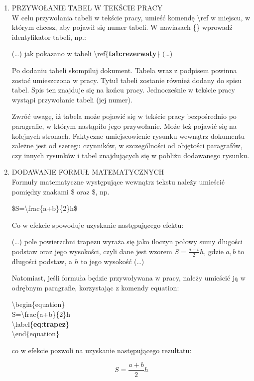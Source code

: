 \begin{enumerate}
	\item PRZYWOŁANIE TABEL W TEKŚCIE PRACY\\
	W celu przywołania tabeli w tekście pracy, umieść komendę \textbackslash ref w miejscu, w którym chcesz, aby pojawił się numer tabeli. W nawiasach \{\} wprowadź identyfikator tabeli, np.:
	
	(\ldots) jak pokazano w tabeli \textbackslash ref\{\textbf{tab:rezerwaty}\} (\ldots) 
	
	Po dodaniu tabeli skompiluj dokument. Tabela wraz z podpisem powinna zostać umieszczona w pracy. Tytuł tabeli zostanie również dodany do spisu tabel. Spis ten znajduje się na końcu pracy. Jednocześnie w tekście pracy wystąpi przywołanie tabeli (jej numer).
	
	Zwróć uwagę, iż tabela może pojawić się w tekście pracy bezpośrednio po paragrafie, w którym nastąpiło jego przywołanie. Może też pojawić się na kolejnych stronach. Faktyczne umiejscowienie rysunku wewnątrz dokumentu zależne jest od szeregu czynników, w szczególności od objętości paragrafów, czy innych rysunków i tabel znajdujących się w pobliżu dodawanego rysunku.
	
	
	\item DODAWANIE FORMUŁ MATEMATYCZNYCH\\
	Formuły matematyczne występujące wewnątrz tekstu należy umieścić pomiędzy znakami \$ oraz \$, np.
	
	\$S=\textbackslash frac\{a+b\}\{2\}h\$
	
	Co w efekcie spowoduje uzyskanie następującego efektu:
	
	(\ldots) pole powierzchni trapezu wyraża się jako iloczyn połowy sumy długości podstaw oraz jego wysokości, czyli dane jest wzorem $S=\frac{a+b}{2}h$, gdzie $a,b$ to długości podstaw, a $h$ to jego wysokość (\ldots)
	
	Natomiast, jeśli formuła będzie przywoływana w pracy, należy umieścić ją w odrębnym paragrafie, korzystając z komendy equation:
	
	\textbackslash begin\{equation\}\\
	S=\textbackslash frac\{a+b\}\{2\}h\\
	\textbackslash label\{\textbf{eq:trapez}\}\\
	\textbackslash end\{equation\}
	
	co w efekcie pozwoli na uzyskanie następującego rezultatu:
	
	\begin{equation}
	S=\frac{a+b}{2}h
	\label{eq:trapez}
	\end{equation}
	

\end{enumerate}
